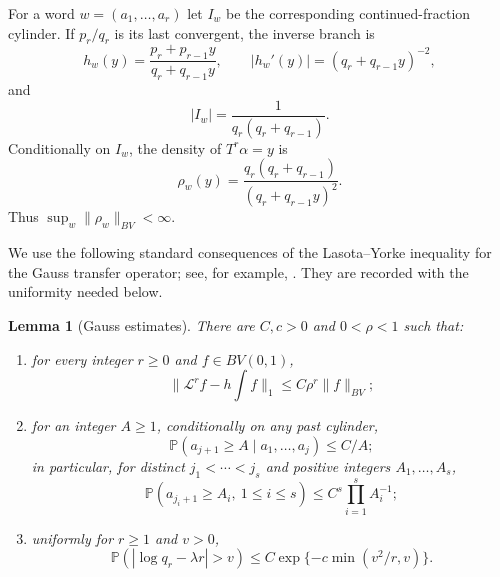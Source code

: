 \documentclass[11pt,a4paper]{amsart}
\newtheorem{lemma}[theorem]{Lemma}
\theoremstyle{definition}
\theoremstyle{remark}
\newcommand{\Pp}{\mathbb P}
\begin{document}
For a word $w=(a_1,\ldots,a_r)$ let $I_w$ be the corresponding
continued-fraction cylinder.  If $p_r/q_r$ is its last convergent, the inverse
branch is
\[
 h_w(y)=\frac{p_r+p_{r-1}y}{q_r+q_{r-1}y},
 \qquad
 |h_w'(y)|=(q_r+q_{r-1}y)^{-2},
\]
and
\begin{equation}\label{eq:cylinder-length}
 |I_w|=\frac1{q_r(q_r+q_{r-1})}.
\end{equation}
Conditionally on $I_w$, the density of $T^r\alpha=y$ is
\[
 \rho_w(y)=\frac{q_r(q_r+q_{r-1})}{(q_r+q_{r-1}y)^2}.
\]
Thus $\sup_w\|\rho_w\|_{BV}<\infty$.

We use the following standard consequences of the Lasota--Yorke inequality
for the Gauss transfer operator; see, for example, \cite{Baladi00}.  They are
recorded with the uniformity needed below.

\begin{lemma}[Gauss estimates]\label{lem:gauss-estimates}
There are $C,c>0$ and $0<\rho<1$ such that:
\begin{enumerate}
\item for every integer $r\ge0$ and $f\in BV(0,1)$,
\[
 \|\mathcal L^rf-h\!\int f\|_1\le C\rho^r\|f\|_{BV};
\]
\item for an integer $A\ge1$, conditionally on any past cylinder,
\[
 \Pp(a_{j+1}\ge A\mid a_1,\ldots,a_j)\le C/A;
\]
in particular, for distinct $j_1<\cdots<j_s$ and positive integers
$A_1,\ldots,A_s$,
\begin{equation}\label{eq:multi-digit-tail}
 \Pp(a_{j_i+1}\ge A_i,\ 1\le i\le s)
 \le C^s\prod_{i=1}^s A_i^{-1};
\end{equation}
\item uniformly for $r\ge1$ and $v>0$,
\begin{equation}\label{eq:q-large-deviation}
 \Pp(|\log q_r-\lambda r|>v)
 \le C\exp\{-c\min(v^2/r,v)\}.
\end{equation}
\end{enumerate}
\end{lemma}
\end{document}
